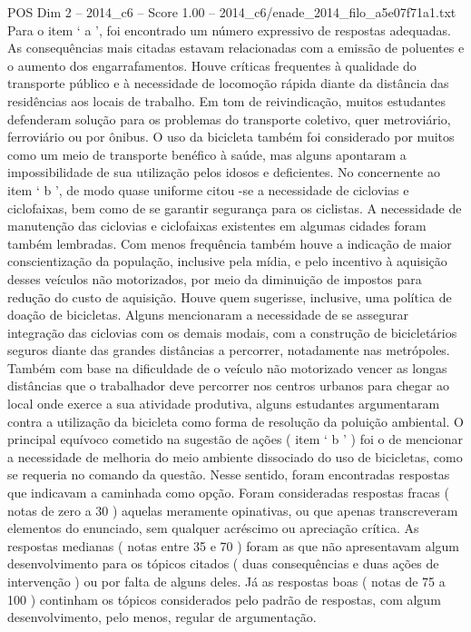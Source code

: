 \begin{textsample}{POS Dim 2 – 2014\_c6 – Score 1.00 – 2014\_c6/enade\_2014\_filo\_a5e07f71a1.txt}
Para o item ‘ a ’, foi encontrado um número expressivo de respostas adequadas.
As consequências mais citadas estavam relacionadas com a emissão de poluentes e o aumento dos engarrafamentos.
Houve críticas frequentes à qualidade do transporte público e à necessidade de locomoção rápida diante da distância das residências aos locais de trabalho.
Em tom de reivindicação, muitos estudantes defenderam solução para os problemas do transporte coletivo, quer metroviário, ferroviário ou por ônibus.
O uso da bicicleta também foi considerado por muitos como um meio de transporte benéfico à saúde, mas alguns apontaram a impossibilidade de sua utilização pelos idosos e deficientes.
No concernente ao item ‘ b ’, de modo quase uniforme citou -se a necessidade de ciclovias e ciclofaixas, bem como de se garantir segurança para os ciclistas.
A necessidade de manutenção das ciclovias e ciclofaixas existentes em algumas cidades foram também lembradas.
Com menos frequência também houve a indicação de maior conscientização da população, inclusive pela mídia, e pelo incentivo à aquisição desses veículos não motorizados, por meio da diminuição de impostos para redução do custo de aquisição.
Houve quem sugerisse, inclusive, uma política de doação de bicicletas.
Alguns mencionaram a necessidade de se assegurar integração das ciclovias com os demais modais, com a construção de bicicletários seguros diante das grandes distâncias a percorrer, notadamente nas metrópoles.
Também com base na dificuldade de o veículo não motorizado vencer as longas distâncias que o trabalhador deve percorrer nos centros urbanos para chegar ao local onde exerce a sua atividade produtiva, alguns estudantes argumentaram contra a utilização da bicicleta como forma de resolução da poluição ambiental.
O principal equívoco cometido na sugestão de ações ( item ‘ b ’ ) foi o de mencionar a necessidade de melhoria do meio ambiente dissociado do uso de bicicletas, como se requeria no comando da questão.
Nesse sentido, foram encontradas respostas que indicavam a caminhada como opção.
Foram consideradas respostas fracas ( notas de zero a 30 ) aquelas meramente opinativas, ou que apenas transcreveram elementos do enunciado, sem qualquer acréscimo ou apreciação crítica.
As respostas medianas ( notas entre 35 e 70 ) foram as que não apresentavam algum desenvolvimento para os tópicos citados ( duas consequências e duas ações de intervenção ) ou por falta de alguns deles.
Já as respostas boas ( notas de 75 a 100 ) continham os tópicos considerados pelo padrão de respostas, com algum desenvolvimento, pelo menos, regular de argumentação.

\end{textsample}
